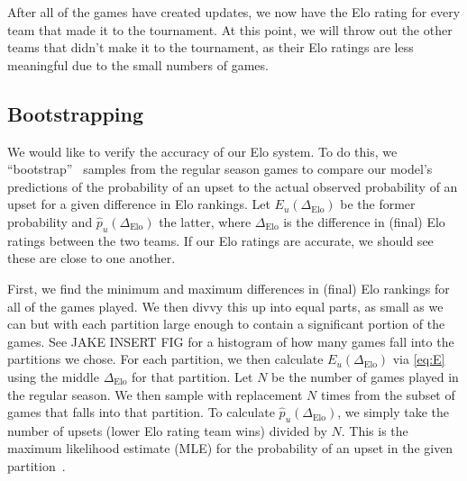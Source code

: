 \documentclass{article}
\begin{document}
After all of the games have created updates, we now have the Elo rating for every team that made it to the tournament. At this point, we will throw out the other teams that didn't make it to the tournament, as their Elo ratings are less meaningful due to the small numbers of games.

\subsection{Bootstrapping}\label{bootstrap}
We would like to verify the accuracy of our Elo system. To do this, we ``bootstrap''~\cite{builtinWhatBootstrapping} samples from the regular season games to compare our model's predictions of the probability of an upset to the actual observed probability of an upset for a given difference in Elo rankings. Let $E_u(\Delta_{\text{Elo}})$ be the former probability and $\hat{p}_u(\Delta_{\text{Elo}})$ the latter, where $\Delta_{\text{Elo}}$ is the difference in (final) Elo ratings between the two teams. If our Elo ratings are accurate, we should see these are close to one another. 

First, we find the minimum and maximum differences in (final) Elo rankings for all of the games played. We then divvy this up into equal parts, as small as we can but with each partition large enough to contain a significant portion of the games. See JAKE INSERT FIG for a histogram of how many games fall into the partitions we chose. For each partition, we then calculate $E_u(\Delta_{\text{Elo}})$ via \autoref{eq:E} using the middle $\Delta_{\text{Elo}}$ for that partition. Let $N$ be the number of games played in the regular season. We then sample with replacement $N$ times from the subset of games that falls into that partition. To calculate $\hat{p}_u(\Delta_{\text{Elo}})$, we simply take the number of upsets (lower Elo rating team wins) divided by $N$. This is the maximum likelihood estimate (MLE) for the probability of an upset in the given partition~\cite{statproofbookMaximumLikelihood}.


\end{document}
